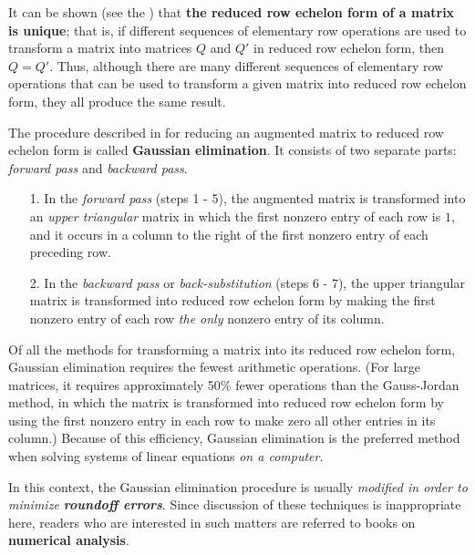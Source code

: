 \begin{remark} \label{remark 3.4.3}
It can be shown (see the ) that \textbf{the reduced row echelon form of a matrix is unique};
that is, if different sequences of elementary row operations are used to transform a matrix into matrices \(Q\) and \(Q'\) in reduced row echelon form, then \(Q = Q'\).
Thus, although there are many different sequences of elementary row operations that can be used to transform a given matrix into reduced row echelon form, they all produce the same result.

The procedure described in  for reducing an augmented matrix to reduced row echelon form is called \textbf{Gaussian elimination}.
It consists of two separate parts: \emph{forward pass} and \emph{backward pass}.

\begin{enumerate}
\item[1.]
In the \emph{forward pass} (steps 1 - 5), the augmented matrix is transformed into an \emph{upper triangular} matrix in which the first nonzero entry of each row is \(1\), and it occurs in a column to the right of the first nonzero entry of each preceding row.

\item[2.]
In the \emph{backward pass} or \emph{back-substitution} (steps 6 - 7), the upper triangular matrix is transformed into reduced row echelon form by making the first nonzero entry of each row \emph{the only} nonzero entry of its column.
\end{enumerate}
\end{remark}

\begin{remark} \label{remark 3.4.4}
Of all the methods for transforming a matrix into its reduced row echelon form, Gaussian elimination requires the fewest arithmetic operations.
(For large matrices, it requires approximately 50\% fewer operations than the Gauss-Jordan method, in which the matrix is transformed into reduced row echelon form by using the first nonzero entry in each row to make zero all other entries in its column.)
Because of this efficiency, Gaussian elimination is the preferred method when solving systems of linear equations \emph{on a computer}.

In this context, the Gaussian elimination procedure is usually \emph{modified in order to minimize \textbf{roundoff errors}}.
Since discussion of these techniques is inappropriate here, readers who are interested in such matters are referred to books on \textbf{numerical analysis}.
\end{remark}

